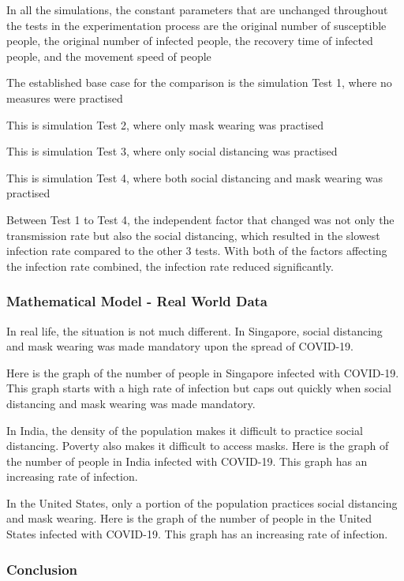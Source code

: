 \documentclass[a4paper,titlepage]{article}
\begin{document}
In all the simulations, the constant parameters that are unchanged throughout the tests in the experimentation process are the original number of susceptible people, the original number of infected people, the recovery time of infected people, and the movement speed of people

The established base case for the comparison is the simulation Test 1, where no measures were practised

This is simulation Test 2, where only mask wearing was practised

This is simulation Test 3, where only social distancing was practised

This is simulation Test 4, where both social distancing and mask wearing was practised

Between Test 1 to Test 4, the independent factor that changed was not only the transmission rate but also the social distancing, which resulted in the slowest infection rate compared to the other 3 tests. With both of the factors affecting the infection rate combined, the infection rate reduced significantly.

\subsubsection{Mathematical Model - Real World Data}

In real life, the situation is not much different. In Singapore, social distancing and mask wearing was made mandatory upon the spread of COVID-19.

Here is the graph of the number of people in Singapore infected with COVID-19. This graph starts with a high rate of infection but caps out quickly when social distancing and mask wearing was made mandatory.

In India, the density of the population makes it difficult to practice social distancing. Poverty also makes it difficult to access masks. Here is the graph of the number of people in India infected with COVID-19. This graph has an increasing rate of infection.

In the United States, only a portion of the population practices social distancing and mask wearing. Here is the graph of the number of people in the United States infected with COVID-19. This graph has an increasing rate of infection.

\subsubsection{Conclusion}
\end{document}
